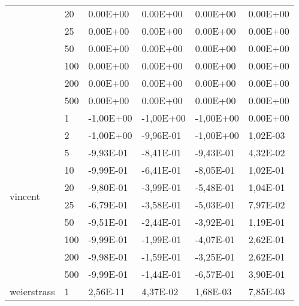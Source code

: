 \begin{longtable}[c]{|p{3.5cm}|l|l|l|l|l|}
                                        & 20        & 0.00E+00   & 0.00E+00   & 0.00E+00   & 0.00E+00  \\ \cline{2-6} 
                                        & 25        & 0.00E+00   & 0.00E+00   & 0.00E+00   & 0.00E+00  \\ \cline{2-6} 
                                        & 50        & 0.00E+00   & 0.00E+00   & 0.00E+00   & 0.00E+00  \\ \cline{2-6} 
                                        & 100       & 0.00E+00   & 0.00E+00   & 0.00E+00   & 0.00E+00  \\ \cline{2-6} 
                                        & 200       & 0.00E+00   & 0.00E+00   & 0.00E+00   & 0.00E+00  \\ \cline{2-6} 
                                        & 500       & 0.00E+00   & 0.00E+00   & 0.00E+00   & 0.00E+00  \\ \hline
\multirow[t]{10}{*}{vincent}               & 1         & -1,00E+00  & -1,00E+00  & -1,00E+00  & 0.00E+00  \\ \cline{2-6} 
                                        & 2         & -1,00E+00  & -9,96E-01  & -1,00E+00  & 1,02E-03  \\ \cline{2-6} 
                                        & 5         & -9,93E-01  & -8,41E-01  & -9,43E-01  & 4,32E-02  \\ \cline{2-6} 
                                        & 10        & -9,99E-01  & -6,41E-01  & -8,05E-01  & 1,02E-01  \\ \cline{2-6} 
                                        & 20        & -9,80E-01  & -3,99E-01  & -5,48E-01  & 1,04E-01  \\ \cline{2-6} 
                                        & 25        & -6,79E-01  & -3,58E-01  & -5,03E-01  & 7,97E-02  \\ \cline{2-6} 
                                        & 50        & -9,51E-01  & -2,44E-01  & -3,92E-01  & 1,19E-01  \\ \cline{2-6} 
                                        & 100       & -9,99E-01  & -1,99E-01  & -4,07E-01  & 2,62E-01  \\ \cline{2-6} 
                                        & 200       & -9,98E-01  & -1,59E-01  & -3,25E-01  & 2,62E-01  \\ \cline{2-6} 
                                        & 500       & -9,99E-01  & -1,44E-01  & -6,57E-01  & 3,90E-01  \\ \hline
\multirow[t]{10}{*}{weierstrass}           & 1         & 2,56E-11   & 4,37E-02   & 1,68E-03   & 7,85E-03  \\ \cline{2-6} 

\end{longtable}

